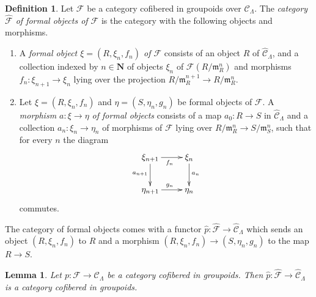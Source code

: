 \documentclass{stacks-project}
\theoremstyle{plain}
\newtheorem{lemma}[subsection]{Lemma}
\theoremstyle{definition}
\newtheorem{definition}[subsection]{Definition}
\theoremstyle{remark}
\numberwithin{equation}{subsection}
\begin{document}
\begin{definition}
\label{definition-formal-objects}
Let $\mathcal{F}$ be a category cofibered in groupoids over
$\mathcal{C}_\Lambda$. The {\it category $\widehat{\mathcal{F}}$ of formal
objects of  $\mathcal{F}$} is the category with the following objects and
morphisms.
\begin{enumerate}
\item A {\it formal object $\xi = (R, \xi_n, f_n)$ of $\mathcal{F}$}
consists of an object $R$ of $\widehat{\mathcal{C}}_\Lambda$, and a collection
indexed by $n \in \mathbf{N}$ of objects $\xi_n$ of
$\mathcal{F}(R/\mathfrak m_R^n)$ and morphisms
$f_n : \xi_{n + 1} \to \xi_n$ lying over the projection
$R/\mathfrak m_R^{n + 1} \to R/\mathfrak m_R^n$.
\item Let $\xi = (R, \xi_n, f_n)$ and $\eta = (S, \eta_n, g_n)$ be
formal objects of $\mathcal{F}$.  A {\it morphism $a : \xi \to \eta$ of
formal objects} consists of a map $a_0 : R \to S$ in
$\widehat{\mathcal{C}}_\Lambda$ and a collection $a_n : \xi_n \to \eta_n$
of morphisms of $\mathcal{F}$ lying over
$R/\mathfrak m_R^n \to S/\mathfrak m_S^n$,
such that for every $n$ the diagram
$$
\xymatrix{
\xi_{n + 1} \ar[r]_{f_n} \ar[d]_{a_{n + 1}} & \xi_n \ar[d]^{a_n} \\
\eta_{n + 1} \ar[r]^{g_n} & \eta_n
}
$$
commutes.
\end{enumerate}
\end{definition}

\noindent
The category of formal objects comes with a functor $\widehat{p}:
\widehat{\mathcal{F}} \to \widehat{\mathcal{C}}_\Lambda$ which sends an
object $(R, \xi_n, f_n)$ to $R$ and a morphism
$(R, \xi_n, f_n) \to (S, \eta_n, g_n)$ to the map $R \to S$.

\begin{lemma}
\label{lemma-completion-cofibred}
Let $p : \mathcal{F} \to \mathcal{C}_\Lambda$ be a category cofibered in
groupoids. Then
$\widehat{p} : \widehat{\mathcal{F}} \to \widehat{\mathcal{C}}_\Lambda$
is a category cofibered in groupoids.
\end{lemma}
\end{document}
